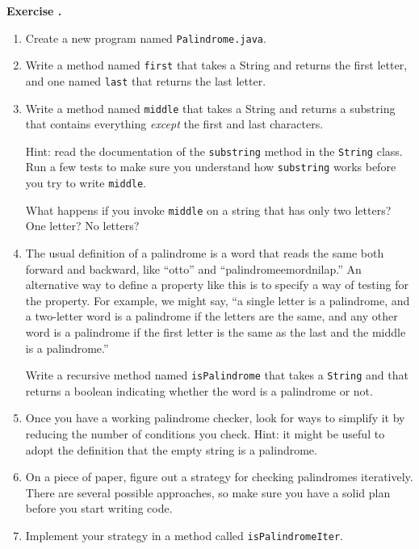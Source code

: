 \documentclass{book}
\newcounter{exercisenum}
\renewcommand{\theexercisenum}{{\thechapter}.\arabic{exercisenum}}
\newenvironment{exercisesize}{\begin{small}}{\end{small}}
\newcommand{\exerciseheader}[2]{                                          
     
  \begin{exercisesize}                                                    
     
     
  \def\theenumi{\alph{enumi}}                                             
  \def\labelenumi{\theenumi.}                                             
  \def\theenumii{\roman{enumii}}                                          
  \def\labelenumii{\theenumii.}                                           
  {\bf Exercise {#1}{#2}}\hspace{0.1in}                 
}
\newcommand{\startexercise}[1]{%
  \refstepcounter{exercisenum}                                            
  \exerciseheader{\theexercisenum}{#1}                                    
}
\newcommand{\stopexercise}{%
  {\hfill}                                                               
  \end{exercisesize}      
}
\newcommand{\normaldif}{}
\newenvironment{exercise}{\startexercise{\normaldif{}}}{\stopexercise}
\begin{document}
\begin{exercise}
\begin{enumerate}

\item Create a new program named {\tt Palindrome.java}.

\item Write a method named {\tt first}
that takes a String and returns the first letter, and one named
{\tt last} that returns the last letter.

\item Write a method named {\tt middle} that takes a String and
returns a substring that contains everything {\em except} the
first and last characters.

Hint: read the documentation of the {\tt substring} method in
the {\tt String} class.
Run a few tests to make sure you understand how {\tt substring} works
before you try to write {\tt middle}.

What happens if you invoke {\tt middle} on a string that has only
two letters?  One letter?  No letters?

\item The usual definition of a palindrome is a word that reads the
same both forward and backward, like ``otto'' and
``palindromeemordnilap.''  An alternative way to define a property
like this is to specify a way of testing for the property.  For
example, we might say, ``a single letter is a palindrome, and a
two-letter word is a palindrome if the letters are the same, and
any other word is a palindrome if
the first letter is the same as the
last and the middle is a palindrome.''

Write a recursive method named {\tt isPalindrome} that takes
a {\tt String} and that returns a boolean indicating whether the
word is a palindrome or not.

\item Once you have a working palindrome checker, look for ways
to simplify it by reducing the number of conditions you check.
Hint: it might be useful to adopt the definition that the empty
string is a palindrome.

\item On a piece of paper, figure out a strategy for checking
palindromes iteratively.  There are several possible approaches,
so make sure you have a solid plan before you start writing code.

\item Implement your strategy in a method called {\tt isPalindromeIter}.

\end{enumerate}
\end{exercise}
\end{document}
